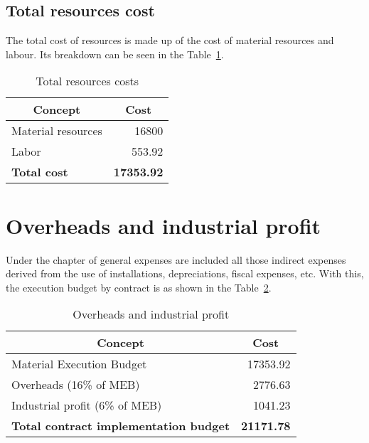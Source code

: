 \subsection*{Total resources cost}
The total cost of resources is made up of the cost of material resources and labour. Its breakdown can be seen in the Table~\ref{tab:totalresources}.

\begin{table}[]
\centering
\begin{tabular}{|l|r|}
\hline
\multicolumn{1}{|c|}{\textbf{Concept}} & \multicolumn{1}{c|}{\textbf{Cost}} \\ \hline
Material resources                     & 16800                              \\ \hline
Labor                                  & 553.92                             \\ \hline\hline
\textbf{Total cost}                    & \textbf{17353.92}                  \\ \hline
\end{tabular}
\caption{Total resources costs}
\label{tab:totalresources}
\end{table}

\section*{Overheads and industrial profit}
Under the chapter of general expenses are included all those indirect expenses derived from the use of installations, depreciations, fiscal expenses, etc. With this, the execution budget by contract is as shown in the Table~\ref{tab:overheads}.

\begin{table}[h]
\centering
\begin{tabular}{|l|r|}
\hline
\multicolumn{1}{|c|}{\textbf{Concept}}        & \multicolumn{1}{c|}{\textbf{Cost}} \\ \hline
Material Execution Budget                     & 17353.92                           \\ \hline
Overheads (16\% of MEB)                       & 2776.63                            \\ \hline
Industrial profit (6\% of MEB)                & 1041.23       \\ \hline\hline
\textbf{Total contract implementation budget} & \textbf{21171.78}                  \\ \hline
\end{tabular}
\caption{Overheads and industrial profit}
\label{tab:overheads}
\end{table}

